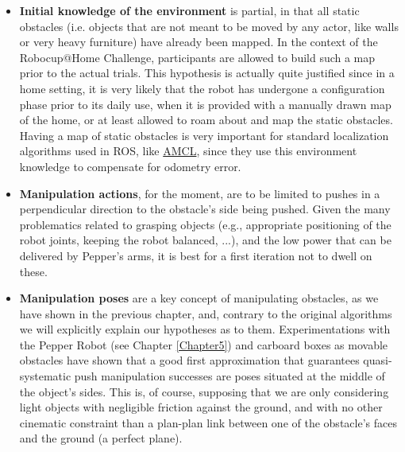 \begin{itemize}
  \item \textbf{Initial knowledge of the environment} is partial, in that all static obstacles (i.e. objects that are not meant to be moved by any actor, like walls or very heavy furniture) have already been mapped. In the context of the Robocup@Home Challenge, participants are allowed to build such a map prior to the actual trials. This hypothesis is actually quite justified since in a home setting, it is very likely that the robot has undergone a configuration phase prior to its daily use, when it is provided with a manually drawn map of the home, or at least allowed to roam about and map the static obstacles. Having a map of static obstacles is very important for standard localization algorithms used in ROS, like \href{http://wiki.ros.org/amcl}{AMCL}, since they use this environment knowledge to compensate for odometry error.
  \item \textbf{Manipulation actions}, for the moment, are to be limited to pushes in a perpendicular direction to the obstacle's side being pushed. Given the many problematics related to grasping objects (e.g., appropriate positioning of the robot joints, keeping the robot balanced, ...), and the low power that can be delivered by Pepper's arms, it is best for a first iteration not to dwell on these.
  \item \textbf{Manipulation poses} are a key concept of manipulating obstacles, as we have shown in the previous chapter, and, contrary to the original algorithms we will explicitly explain our hypotheses as to them. Experimentations with the Pepper Robot (see Chapter \ref{Chapter5}) and carboard boxes as movable obstacles have shown that a good first approximation that guarantees quasi-systematic push manipulation successes are poses situated at the middle of the object's sides. This is, of course, supposing that we are only considering light objects with negligible friction against the ground, and with no other cinematic constraint than a plan-plan link between one of the obstacle's faces and the ground (a perfect plane).



\end{itemize}
